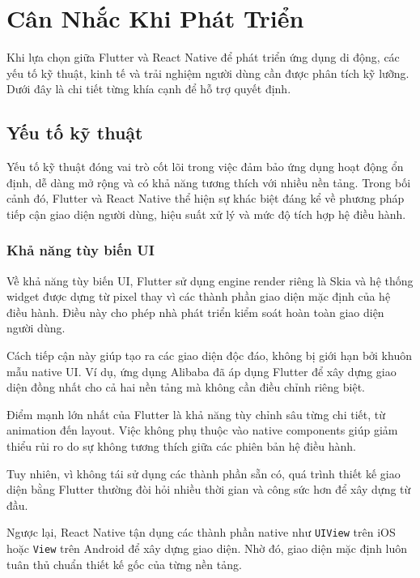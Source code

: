 \section{Cân Nhắc Khi Phát Triển}


  \hspace*{0.8cm}Khi lựa chọn giữa Flutter và React Native để phát triển ứng dụng di động, các yếu tố kỹ thuật, kinh tế và trải nghiệm người dùng cần được phân tích kỹ lưỡng. Dưới đây là chi tiết từng khía cạnh để hỗ trợ quyết định.
\vspace{0.5em}

\subsection{Yếu tố kỹ thuật}

\hspace*{1.3em} Yếu tố kỹ thuật đóng vai trò cốt lõi trong việc đảm bảo ứng dụng hoạt động ổn định, dễ dàng mở rộng và có khả năng tương thích với nhiều nền tảng. Trong bối cảnh đó, Flutter và React Native thể hiện sự khác biệt đáng kể về phương pháp tiếp cận giao diện người dùng, hiệu suất xử lý và mức độ tích hợp hệ điều hành.

\subsubsection{Khả năng tùy biến UI}

\hspace*{1.3em} Về khả năng tùy biến UI, Flutter sử dụng engine render riêng là Skia và hệ thống widget được dựng từ pixel thay vì các thành phần giao diện mặc định của hệ điều hành. Điều này cho phép nhà phát triển kiểm soát hoàn toàn giao diện người dùng.

\indent Cách tiếp cận này giúp tạo ra các giao diện độc đáo, không bị giới hạn bởi khuôn mẫu native UI. Ví dụ, ứng dụng Alibaba đã áp dụng Flutter để xây dựng giao diện đồng nhất cho cả hai nền tảng mà không cần điều chỉnh riêng biệt.

\indent Điểm mạnh lớn nhất của Flutter là khả năng tùy chỉnh sâu từng chi tiết, từ animation đến layout. Việc không phụ thuộc vào native components giúp giảm thiểu rủi ro do sự không tương thích giữa các phiên bản hệ điều hành.

\indent Tuy nhiên, vì không tái sử dụng các thành phần sẵn có, quá trình thiết kế giao diện bằng Flutter thường đòi hỏi nhiều thời gian và công sức hơn để xây dựng từ đầu.

\indent Ngược lại, React Native tận dụng các thành phần native như \texttt{UIView} trên iOS hoặc \texttt{View} trên Android để xây dựng giao diện. Nhờ đó, giao diện mặc định luôn tuân thủ chuẩn thiết kế gốc của từng nền tảng.


